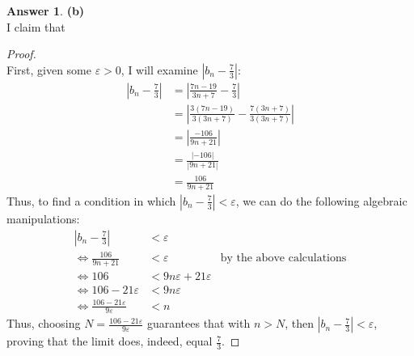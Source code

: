 \documentclass[10pt,a4paper]{article}
\theoremstyle{definition}
\newtheorem*{answer*}{Answer}
\begin{document}
\begin{answer*}{\textbf{(b)}}
\\I claim that 
\begin{proof}{$ $}
\\First, given some $\varepsilon > 0$, I will examine $\displaystyle \left|b_n - \frac{7}{3}\right|$:
\begin{align*}
\left|b_n - \frac{7}{3}\right| &= \left|\frac{7n - 19}{3n + 7} - \frac{7}{3}\right|\\
&= \left|\frac{3(7n - 19)}{3(3n + 7)} - \frac{7(3n + 7)}{3(3n + 7)}\right|\\
&= \left|\frac{-106}{9n + 21}\right|\\
&= \frac{|-106|}{|9n + 21|}\\
&= \frac{106}{9n + 21}
\end{align*}
Thus, to find a condition in which $\displaystyle \left|b_n - \frac{7}{3}\right| < \varepsilon$, we can do the following algebraic manipulations:
\begin{align*}
\left|b_n - \frac{7}{3}\right| &< \varepsilon\\
\iff \frac{106}{9n + 21} &< \varepsilon &\text{by the above calculations}\\
\iff 106 &< 9n\varepsilon + 21\varepsilon\\
\iff 106 - 21\varepsilon &< 9n\varepsilon\\
\iff \frac{106 - 21\varepsilon}{9\varepsilon} &< n
\end{align*}
Thus, choosing $\displaystyle N = \frac{106 - 21\varepsilon}{9\varepsilon}$ guarantees that with $n > N$, then $\displaystyle \left|b_n - \frac{7}{3}\right| < \varepsilon$, proving that the limit does, indeed, equal $\displaystyle \frac{7}{3}$.
\end{proof}
\end{answer*}
\end{document}
